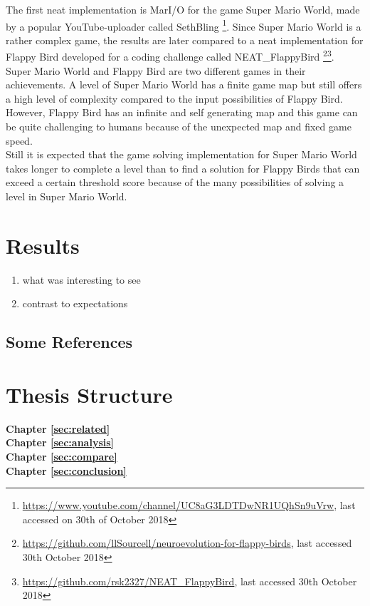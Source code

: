 The first \gls{neat} implementation is MarI/O for the game Super Mario World, made by a popular YouTube-uploader called SethBling \footnote{\url{https://www.youtube.com/channel/UC8aG3LDTDwNR1UQhSn9uVrw}, last accessed on 30th of October 2018}. Since Super Mario World is a rather complex game, the results are later compared to a \gls{neat} implementation for Flappy Bird developed for a coding challenge called NEAT\_FlappyBird \footnote{\url{https://github.com/llSourcell/neuroevolution-for-flappy-birds}, last accessed 30th October 2018}\footnote{\url{https://github.com/rsk2327/NEAT_FlappyBird}, last accessed 30th October 2018}. \\
Super Mario World and Flappy Bird are two different games in their achievements. A level of Super Mario World has a finite game map but still offers a high level of complexity compared to the input possibilities of Flappy Bird. However, Flappy Bird has an infinite and self generating map and this game can be quite challenging to humans because of the unexpected map and fixed game speed.\\ 
Still it is expected that the game solving implementation for Super Mario World takes longer to complete a level than to find a solution for Flappy Birds that can exceed a certain threshold score because of the many possibilities of solving a level in Super Mario World.

\section{Results}
\label{sec:intro:results}
\begin{enumerate}
	\item what was interesting to see
	\item contrast to expectations
\end{enumerate}


\subsection{Some References}
\label{sec:intro:results:refs}

\section{Thesis Structure}
\label{sec:intro:structure}

\textbf{Chapter \ref{sec:related}} \\[0.2em]

\textbf{Chapter \ref{sec:analysis}} \\[0.2em]

\textbf{Chapter \ref{sec:compare}} \\[0.2em]

\textbf{Chapter \ref{sec:conclusion}} \\[0.2em]
